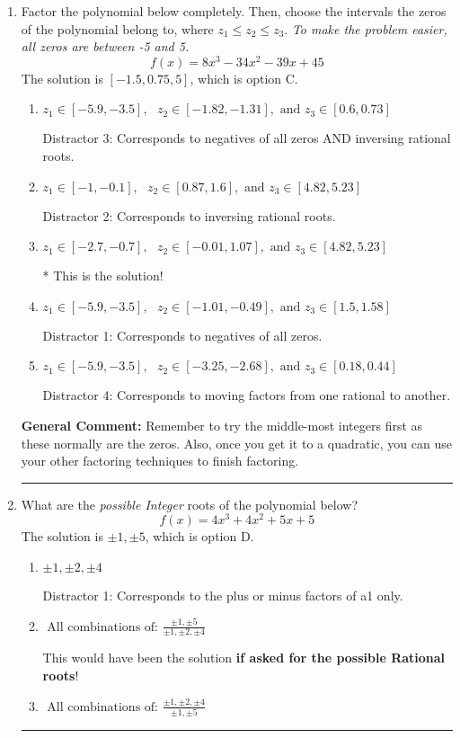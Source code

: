 \documentclass{extbook}[14pt]
\newcommand{\litem}[1]{\item #1

\rule{\textwidth}{0.4pt}}
\begin{document}
\begin{enumerate}\litem{
Factor the polynomial below completely. Then, choose the intervals the zeros of the polynomial belong to, where $z_1 \leq z_2 \leq z_3$. \textit{To make the problem easier, all zeros are between -5 and 5.}
\[ f(x) = 8x^{3} -34 x^{2} -39 x + 45 \]The solution is \( [-1.5, 0.75, 5] \), which is option C.\begin{enumerate}[label=\Alph*.]
\item \( z_1 \in [-5.9, -3.5], \text{   }  z_2 \in [-1.82, -1.31], \text{   and   } z_3 \in [0.6, 0.73] \)

 Distractor 3: Corresponds to negatives of all zeros AND inversing rational roots.
\item \( z_1 \in [-1, -0.1], \text{   }  z_2 \in [0.87, 1.6], \text{   and   } z_3 \in [4.82, 5.23] \)

 Distractor 2: Corresponds to inversing rational roots.
\item \( z_1 \in [-2.7, -0.7], \text{   }  z_2 \in [-0.01, 1.07], \text{   and   } z_3 \in [4.82, 5.23] \)

* This is the solution!
\item \( z_1 \in [-5.9, -3.5], \text{   }  z_2 \in [-1.01, -0.49], \text{   and   } z_3 \in [1.5, 1.58] \)

 Distractor 1: Corresponds to negatives of all zeros.
\item \( z_1 \in [-5.9, -3.5], \text{   }  z_2 \in [-3.25, -2.68], \text{   and   } z_3 \in [0.18, 0.44] \)

 Distractor 4: Corresponds to moving factors from one rational to another.
\end{enumerate}

\textbf{General Comment:} Remember to try the middle-most integers first as these normally are the zeros. Also, once you get it to a quadratic, you can use your other factoring techniques to finish factoring.
}
\litem{
What are the \textit{possible Integer} roots of the polynomial below?
\[ f(x) = 4x^{3} +4 x^{2} +5 x + 5 \]The solution is \( \pm 1,\pm 5 \), which is option D.\begin{enumerate}[label=\Alph*.]
\item \( \pm 1,\pm 2,\pm 4 \)

 Distractor 1: Corresponds to the plus or minus factors of a1 only.
\item \( \text{ All combinations of: }\frac{\pm 1,\pm 5}{\pm 1,\pm 2,\pm 4} \)

This would have been the solution \textbf{if asked for the possible Rational roots}!
\item \( \text{ All combinations of: }\frac{\pm 1,\pm 2,\pm 4}{\pm 1,\pm 5} \)


\end{enumerate}}
\end{enumerate}
\end{document}
